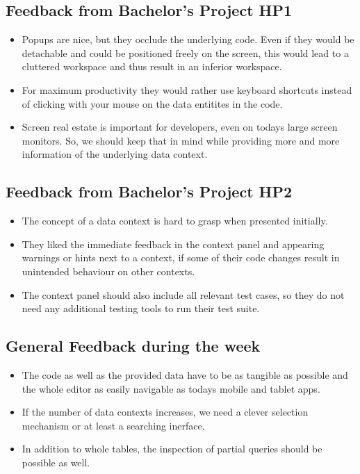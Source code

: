 \subsection{Feedback from Bachelor's Project HP1}
\label{subsec:FeedbackBPHP1}
\begin{itemize}
	\item Popups are nice, but they occlude the underlying code. Even if they would be detachable and could be positioned freely on the screen, this would lead to a cluttered workspace and thus result in an inferior workspace.

	\item For maximum productivity they would rather use keyboard shortcuts instead of clicking with your mouse on the data entitites in the code.

	\item Screen real estate is important for developers, even on todays large screen monitors. So, we should keep that in mind while providing more and more information of the underlying data context.
\end{itemize}

\subsection{Feedback from Bachelor's Project HP2}
\label{subsec:FeedbackBPHP2}
\begin{itemize}
	\item The concept of a data context is hard to grasp when presented initially.

	\item They liked the immediate feedback in the context panel and appearing warnings or hints next to a context, if some of their code changes result in unintended behaviour on other contexts.

	\item The context panel should also include all relevant test cases, so they do not need any additional testing tools to run their test suite.
\end{itemize}

\subsection{General Feedback during the week}
\label{subsec:FeedbackWeek}
\begin{itemize}
	\item The code as well as the provided data have to be as tangible as possible and the whole editor as easily navigable as todays mobile and tablet apps.

	\item If the number of data contexts increases, we need a clever selection mechanism or at least a searching inerface.

	\item In addition to whole tables, the inspection of partial queries should be possible as well.
\end{itemize}

